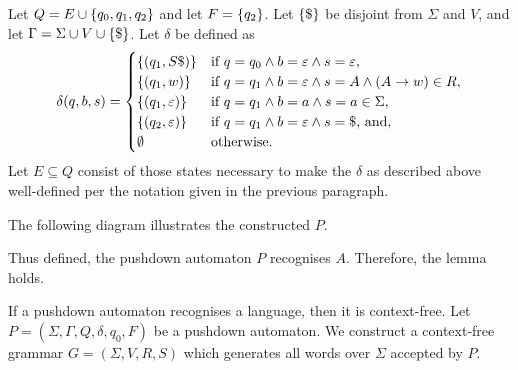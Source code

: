   Let \(Q = E \cup \{q_0, q_1, q_2\}\) and let \(F = \{q_2\}\). Let \(\{\$\}\) be disjoint from \(\Sigma\) and
  \(V\), and let \(\Gamma = \Sigma \cup V \cup \{\$\}\). Let \(\delta\) be defined as
  \[
    \delta(q, b, s) = \begin{cases}
      \{(q_1, S \$)\} & \text{if } q = q_0 \land b = \varepsilon \land s = \varepsilon,\\
      \{(q_1, w)\} & \text{if } q = q_1 \land b = \varepsilon \land s = A \land (A \to w) \in R,\\
      \{(q_1, \varepsilon)\} & \text{if } q = q_1 \land b = a \land s = a \in \Sigma,\\
      \{(q_2, \varepsilon)\} & \text{if } q = q_1 \land b = \varepsilon \land s = \$\text{, and},\\
      \emptyset & \text{otherwise.}
    \end{cases}
  \]
  Let \(E \subseteq Q\) consist of those states necessary to make the \(\delta\) as described above well-defined per the
  notation given in the previous paragraph.

  The following diagram illustrates the constructed \(P\).
  \begin{figure}[!ht]
    \centering
  \end{figure}

  Thus defined, the pushdown automaton \(P\) recognises \(A\). Therefore, the lemma holds.
\Epr

\Blm
  \label{lem4}
  If a pushdown automaton recognises a language, then it is context-free.
\Elm
\Bpr
  Let \(P = (\Sigma, \Gamma, Q, \delta, q_0, F)\) be a pushdown automaton. We construct a context-free grammar \(G
  = (\Sigma, V, R, S)\) which generates all words over \(\Sigma\) accepted by \(P\).

